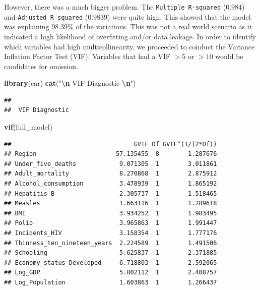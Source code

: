\documentclass[
  10pt,
]{article}
\newenvironment{Shaded}{\begin{snugshade}}{\end{snugshade}}
\newcommand{\FunctionTok}[1]{\textcolor[rgb]{0.13,0.29,0.53}{\textbf{#1}}}
\newcommand{\NormalTok}[1]{#1}
\newcommand{\SpecialCharTok}[1]{\textcolor[rgb]{0.81,0.36,0.00}{\textbf{#1}}}
\newcommand{\StringTok}[1]{\textcolor[rgb]{0.31,0.60,0.02}{#1}}
\begin{document}
However, there was a much bigger problem. The
\texttt{Multiple\ R-squared} (\(0.984\)) and
\texttt{Adjusted\ R-squared} (\(0.9839\)) were quite high. This showed
that the model was explaining 98.39\% of the variations. This was not a
real world scenario as it indicated a high likelihood of overfitting
and/or data leakage. In order to identify which variables had high
multicollinearity, we proceeded to conduct the Variance Inflation Factor
Test (VIF). Variables that had a VIF \(>5\) or \(>10\) would be
candidates for omission.\\

\begin{Shaded}
\begin{Highlighting}[]
\FunctionTok{library}\NormalTok{(car)}
\FunctionTok{cat}\NormalTok{(}\StringTok{"}\SpecialCharTok{\textbackslash{}n}\StringTok{ VIF Diagnostic }\SpecialCharTok{\textbackslash{}n}\StringTok{"}\NormalTok{)}
\end{Highlighting}
\end{Shaded}

\begin{verbatim}
## 
##  VIF Diagnostic
\end{verbatim}

\begin{Shaded}
\begin{Highlighting}[]
\FunctionTok{vif}\NormalTok{(full\_model)}
\end{Highlighting}
\end{Shaded}

\begin{verbatim}
##                                  GVIF Df GVIF^(1/(2*Df))
## Region                      57.135455  8        1.287676
## Under_five_deaths            9.071305  1        3.011861
## Adult_mortality              8.270868  1        2.875912
## Alcohol_consumption          3.478939  1        1.865192
## Hepatitis_B                  2.305737  1        1.518465
## Measles                      1.663116  1        1.289618
## BMI                          3.934252  1        1.983495
## Polio                        3.965863  1        1.991447
## Incidents_HIV                3.158354  1        1.777176
## Thinness_ten_nineteen_years  2.224589  1        1.491506
## Schooling                    5.625837  1        2.371885
## Economy_status_Developed     6.718803  1        2.592065
## Log_GDP                      5.802112  1        2.408757
## Log_Population               1.603863  1        1.266437
\end{verbatim}
\end{document}
